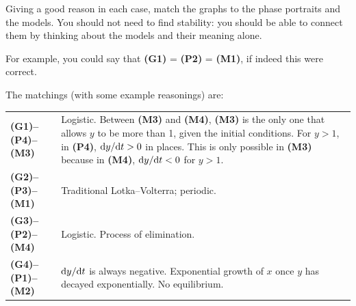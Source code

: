 \documentclass[a4paper, 12pt]{article}
\begin{document}
\begin{enumerate}[label={\bf \arabic{*}.\;}, ref={\arabic{*}},itemsep=3ex, left=0ex]
{      Giving a good reason in each case, match the graphs to the phase portraits and the models. You should not need to find stability: you should be able to connect them by thinking about the models and their meaning alone.

      For example, you could say that \textbf{(G1)} = \textbf{(P2)} = \textbf{(M1)}, if indeed this were correct.
    }
    {
      The matchings (with some example reasonings) are:

      \begin{tabular}{lp{11.5cm}}
        \textbf{(G1)--(P4)--(M3)} & Logistic. Between \textbf{(M3)} and \textbf{(M4)}, \textbf{(M3)} is the only one that allows $y$ to be more than 1, given the initial conditions. For $y>1$, in \textbf{(P4)}, $\fd{y}{t}>0$ in places. This is only possible in \textbf{(M3)} because in \textbf{(M4)}, $\fd{y}{t}<0$ for $y>1$. \\
        \textbf{(G2)--(P3)--(M1)} & Traditional Lotka--Volterra; periodic. \\
        \textbf{(G3)--(P2)--(M4)} & Logistic. Process of elimination. \\
        \textbf{(G4)--(P1)--(M2)} & $\fd{y}{t}$ is always negative. Exponential growth of $x$ once $y$ has decayed exponentially. No equilibrium.
      \end{tabular}
    }
\end{enumerate}
\end{document}
